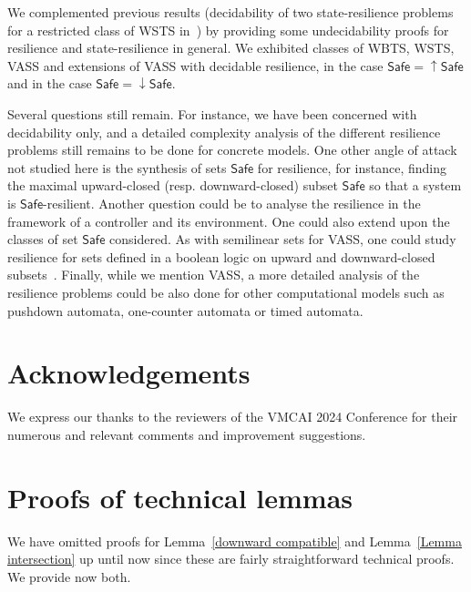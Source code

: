 \documentclass[runningheads]{llncs}
\newcommand{\mathieu}[1]{\todo[inline,color=blue!20]{{\bf MH:} #1}}
\newcommand{\Safe}{\textsf{Safe}}
\begin{document}
We complemented previous results (decidability of two state-resilience problems for a restricted class of WSTS in~\cite{DBLP:journals/corr/PrasadZ16,DBLP:journals/corr/abs-2108-00889,DBLP:conf/gg/Ozkan22}) by providing some undecidability proofs for resilience and state-resilience in general. We exhibited classes of WBTS, WSTS, VASS and extensions of VASS with decidable resilience, in the case 
 $\Safe = \mathop{\uparrow} \Safe$ and in the case 
 $\Safe = \mathop{\downarrow} \Safe$.

Several questions still remain.
For instance, we have been concerned with decidability only, and a detailed complexity analysis of the different resilience problems still remains to be done for concrete models. 
One other angle of attack not studied here is the synthesis of sets 
$\Safe$ for resilience,
for instance, 
 finding the maximal upward-closed (resp. downward-closed) subset 
$\Safe$ so that a system is $\Safe$-resilient. 
Another question could be to analyse the resilience in the framework of a controller and its environment. 
One could also extend upon the classes of set $\Safe$ 
 considered. As with semilinear sets for VASS, one could study resilience for sets defined in a boolean logic on upward and downward-closed subsets~\cite{DBLP:journals/fmsd/BertrandS13}. Finally, while we mention VASS, a more detailed analysis of the resilience problems could be also done for other computational models such as pushdown automata, one-counter automata or timed automata.


\section*{Acknowledgements} We express our thanks to the reviewers of the VMCAI 2024 Conference for their numerous and relevant comments and improvement suggestions.




\appendix


\section{Proofs of technical lemmas}


We have omitted proofs for Lemma~\ref{downward compatible} and Lemma~\ref{Lemma intersection}
up until now since these are fairly straightforward technical proofs.
We provide now both. \\
\end{document}
